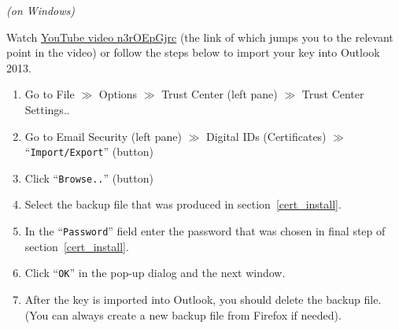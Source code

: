 \documentclass[pdftex,12pt,titlepage=false]{scrartcl}
\begin{document}
\begin{minipage}[t]{0.47\textwidth}
  \centerline{\textsl{(on Windows)}}
  Watch
  \href{https://www.youtube.com/watch?v=n3rOEpGjrc\&start=390}{YouTube
    video n3rOEpGjrc} (the link of which jumps you to the relevant
  point in the video)
  or follow the steps below to import your key into Outlook 2013.
  \begin{enumerate}
  \item Go to File $\gg$ Options $\gg$ Trust Center (left pane) $\gg$
    Trust Center Settings..
  \item Go to Email Security (left pane) $\gg$ Digital IDs
    (Certificates) $\gg$ ``\texttt{Import/Export}'' (button)
  \item Click ``\texttt{Browse..}'' (button)
  \item Select the backup file that was produced in
    section~\ref{cert_install}.
  \item In the ``\texttt{Password}'' field enter the password that was
    chosen in final step of section~\ref{cert_install}.
  \item Click ``\texttt{OK}'' in the pop-up dialog and the next
    window.
  \item After the key is imported into Outlook, you should delete the
    backup file.  (You can always create a new backup file from
    Firefox if needed).
\end{enumerate}
\end{minipage}
\end{document}
